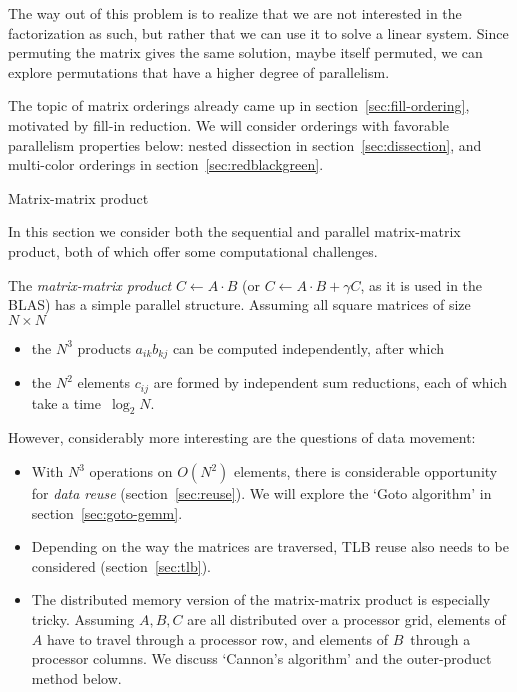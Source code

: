 The way out of this problem is to realize that we are not interested
in the factorization as such, but rather that we can use it to solve a
linear system. Since permuting the matrix gives the same solution,
maybe itself permuted, we can explore permutations that have a higher
degree of parallelism.

The topic of matrix orderings already came up in
section~\ref{sec:fill-ordering}, motivated by fill-in reduction.
We will consider orderings with favorable parallelism properties
below: nested dissection in section~\ref{sec:dissection}, and
multi-color orderings in section~\ref{sec:redblackgreen}.


 {Matrix-matrix product}

In this section we consider both the sequential and parallel
matrix-matrix product, both of which offer some computational challenges.

The \emph{matrix-matrix product} $C\leftarrow A\cdot B$
%
(or $C\leftarrow A\cdot B+\gamma C$, as it is used in the \ac{BLAS}) 
%
has a simple parallel structure. Assuming all square matrices of size
$N\times N$
\begin{itemize}
\item  the $N^3$ products $a_{ik}b_{kj}$ can be computed independently,
  after which
\item the $N^2$ elements $c_{ij}$ are formed by independent sum
  reductions, each of which take a time~$\log_2 N$. 
\end{itemize}
However, considerably more interesting are the questions of data
movement:
\begin{itemize}
\item With $N^3$ operations on $O(N^2)$ elements, there is
  considerable opportunity for
  \emph{data reuse}%
  (section~\ref{sec:reuse}). We will explore the `Goto algorithm' in
  section~\ref{sec:goto-gemm}.
\item Depending on the way the matrices are traversed, \ac{TLB} reuse
  also needs to be considered (section~\ref{sec:tlb}).
\item The distributed memory version of the matrix-matrix product is
  especially tricky. Assuming $A,B,C$ are all distributed over a
  processor grid, elements of $A$ have to travel through a processor
  row, and elements of $B$~through a processor columns. We discuss 
  `Cannon's algorithm' and the outer-product method below.
\end{itemize}

